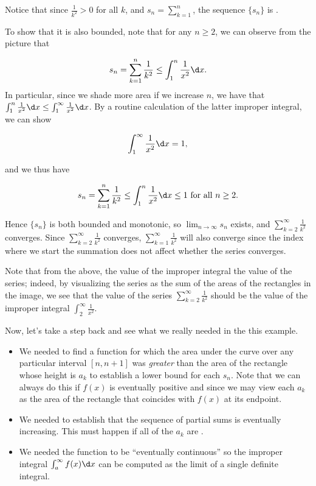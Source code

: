 \documentclass{ximera}
\begin{document}
\begin{model}
Notice that since $\frac{1}{k^2} > 0$ for all $k$, and $s_n = \sum_{k=1}^n$, the sequence $\{s_n\}$ is .  

To show that it is also bounded, note that for any $n \geq 2$, we can observe from the picture that 

\[
s_n = \sum_{k=1}^n\frac{1}{k^2} \leq
\int_1^n \frac{1}{x^2} \d x.
\]
In particular, since we shade more area if we increase $n$, we have that $\int_1^n \frac{1}{x^2} \d x \leq \int_1^\infty \frac{1}{x^2} \d x$.  By a routine calculation of the latter improper integral, we can show

\[
\int_1^\infty \frac{1}{x^2} \d x = 1,
\]

and we thus have 

\[
s_n = \sum_{k=1}^n\frac{1}{k^2} \leq \int_1^n \frac{1}{x^2} \d x \leq 1 \textrm{ for all } n \geq 2.
\]

Hence $\{s_n\}$ is both bounded and monotonic, so $\lim_{n \to \infty} s_n$ exists, and $\sum_{k=2}^{\infty} \frac{1}{k^2}$ converges.  Since $\sum_{k=2}^{\infty} \frac{1}{k^2}$ converges, $\sum_{k=1}^{\infty} \frac{1}{k^2}$ will also converge since the index where we start the summation does not affect whether the series converges.

Note that from the above, the value of the improper integral  the value of the series; indeed, by visualizing the series as the sum of the areas of the rectangles in the image, we see that the value of the series $\sum_{k=2}^{\infty} \frac{1}{k^2}$ should be  the value of the improper integral $\int_2^{\infty} \frac{1}{x^2}$.

\end{model}


Now, let's take a step back and see what we really needed in the this example.

\begin{itemize}
\item We needed to find a function for which the area under the curve over any particular interval $[n,n+1]$ was \emph{greater} than the area of the rectangle whose height is $a_k$ to establish a lower bound for each $s_n$.  Note that we can always do this if $f(x)$ is eventually positive and  since we may view each $a_k$ as the area of the rectangle that coincides with $f(x)$ at its  endpoint.
\item We needed to establish that the sequence of partial sums is eventually increasing.  This must happen if all of the $a_k$ are .
\item We needed the function to be ``eventually continuous'' so the improper integral $\int_{a}^{\infty} f(x) \d x$ can be computed as the limit of a single definite integral.
\end{itemize}
\end{document}
